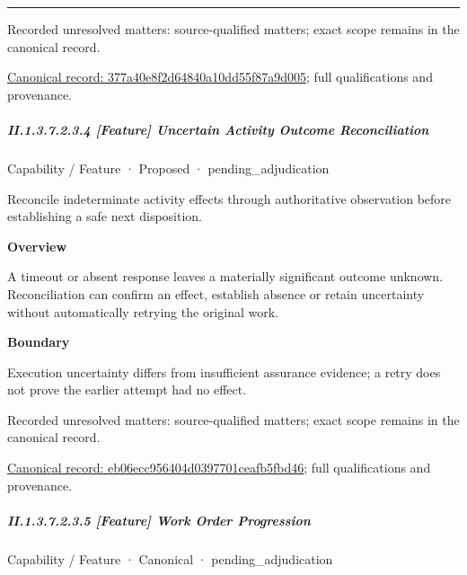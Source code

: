 \medskip\hrule\medskip

{\small Recorded unresolved matters: source-qualified matters; exact scope remains in the canonical record.}\par
{\footnotesize \href{../../../../continuum/strategy/capability/feature/377a40e8f2d64840a10dd55f87a9d005.md}{Canonical record: 377a40e8f2d64840a10dd55f87a9d005}; full qualifications and provenance.}\par
\subparagraph*{II.1.3.7.2.3.4 [Feature] Uncertain Activity Outcome Reconciliation}
\label{navigation:II.1.3.7.2.3.4}

\label{element:eb06ecc956404d0397701ceafb5fbd46}
{\small Capability / Feature · Proposed · pending\_adjudication}\par

Reconcile indeterminate activity effects through authoritative observation before establishing a safe next disposition.



\textbf{Overview}



A timeout or absent response leaves a materially significant outcome unknown. Reconciliation can confirm an effect, establish absence or retain uncertainty without automatically retrying the original work.



\textbf{Boundary}



Execution uncertainty differs from insufficient assurance evidence; a retry does not prove the earlier attempt had no effect.


{\small Recorded unresolved matters: source-qualified matters; exact scope remains in the canonical record.}\par
{\footnotesize \href{../../../../continuum/strategy/capability/feature/eb06ecc956404d0397701ceafb5fbd46.md}{Canonical record: eb06ecc956404d0397701ceafb5fbd46}; full qualifications and provenance.}\par
\subparagraph*{II.1.3.7.2.3.5 [Feature] Work Order Progression}
\label{navigation:II.1.3.7.2.3.5}

\label{element:5ca494e85869419c867618fd9648d03a}
{\small Capability / Feature · Canonical · pending\_adjudication}\par

